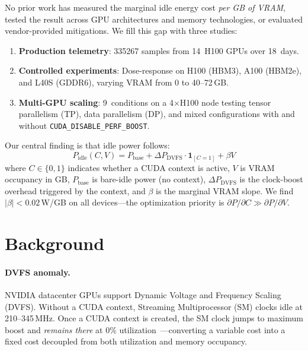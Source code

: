 \documentclass[sigconf,anonymous,review]{acmart}
\newcommand{\perfboost}{\texttt{CUDA\_\hspace{0pt}DISABLE\_\hspace{0pt}PERF\_\hspace{0pt}BOOST}}
\begin{document}
No prior work has measured the marginal idle energy cost \emph{per GB of VRAM}, tested the result across GPU architectures and memory technologies, or evaluated vendor-provided mitigations. We fill this gap with three studies:

\begin{enumerate}
    \item \textbf{Production telemetry}: \num{335267} samples from 14~H100 GPUs over 18~days.
    \item \textbf{Controlled experiments}: Dose-response on H100 (HBM3), A100 (HBM2e), and L40S (GDDR6), varying VRAM from 0 to 40--72\,GB.
    \item \textbf{Multi-GPU scaling}: 9~conditions on a 4$\times$H100 node testing tensor parallelism (TP), data parallelism (DP), and mixed configurations with and without \perfboost.
\end{enumerate}

Our central finding is that idle power follows:
\begin{equation}
    P_{\text{idle}}(C, V) = P_{\text{base}} + \Delta P_{\text{DVFS}} \cdot \mathbf{1}_{[C=1]} + \beta V
    \label{eq:model}
\end{equation}
where $C \in \{0,1\}$ indicates whether a CUDA context is active, $V$ is VRAM occupancy in GB, $P_{\text{base}}$ is bare-idle power (no context), $\Delta P_{\text{DVFS}}$ is the clock-boost overhead triggered by the context, and $\beta$ is the marginal VRAM slope. We find $|\beta| < 0.02$\,W/GB on all devices---the optimization priority is $\partial P / \partial C \gg \partial P / \partial V$.

\section{Background}

\paragraph{DVFS anomaly.} NVIDIA datacenter GPUs support Dynamic Voltage and Frequency Scaling (DVFS). Without a CUDA context, Streaming Multiprocessor (SM) clocks idle at 210--345\,MHz. Once a CUDA context is created, the SM clock jumps to maximum boost and \emph{remains there} at 0\% utilization~\cite{patel-cal23}---converting a variable cost into a fixed cost decoupled from both utilization and memory occupancy.
\end{document}
